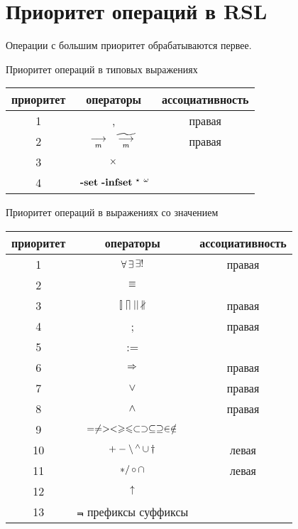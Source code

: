 \chapter{Приоритет операций в RSL}\label{sec:priority}

Операции с большим приоритет обрабатываются первее.

Приоритет операций в типовых выражениях
\begin{center}
\begin{tabular}{|c|c|c|}
\hline приоритет & операторы & ассоциативность\\
\hline  1 & , & правая\\
\hline  2 & $~\mathop{\longrightarrow}\limits_{m}~ ~\widetilde{~\mathop{\longrightarrow}\limits_{m}~}~$ & правая\\
\hline  3 & $\mathop{\times}$ & \\
\hline  4 & ${\ }\Set {\ }\Infset {\ }\List {\ }\Inflist$ & \\
\hline
\end{tabular}
\end{center}

Приоритет операций в выражениях со значением
\begin{center}
\begin{tabular}{|c|c|c|}
\hline приоритет & операторы & ассоциативность\\
\hline 1 & $\mathop{\forall} \mathop{\exists} \mathop{\exists!}$ & правая \\
\hline 2 & $\mathop{\equiv}$ & \\
\hline 3 & $\mathop{[\!]} \mathop{\lceil\!\rceil} || \mathop{\nparallel}$ & правая \\
\hline 4 & ; & правая \\
\hline 5 & := & \\
\hline 6 & $\mathop{\Rightarrow}$ & правая \\
\hline 7 & $\vee$ & правая \\
\hline 8 & $\wedge$ & правая \\
\hline 9 & $= \neq > < \geqslant\leqslant \subset \supset \subseteq \supseteq
\in \notin$ &  \\
\hline 10 & $+ - \mathop{\setminus} \mathop{{ }^\wedge} \mathop{\cup} \mathop{\dag}$ & левая \\
\hline 11 & $* / \mathop{\circ} \mathop{\cap}$ & левая \\
\hline 12 & $\uparrow$ & \\
\hline 13 & $\Not$ префиксы суффиксы& \\
\hline
\end{tabular}
\end{center}
